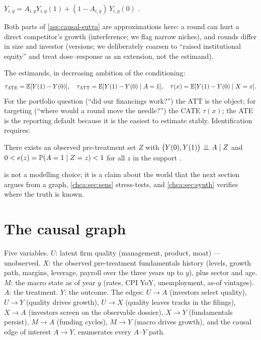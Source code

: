 \begin{assumption}[Consistency]\label{ass:causal-consistency}
$Y_{i,y} = A_{i,y} Y_{i,y}(1) + (1 - A_{i,y})\, Y_{i,y}(0)$ \citep{hernan2020}.
\end{assumption}

Both parts of \cref{ass:causal-sutva} are approximations here: a round can hurt a direct
competitor's growth (interference; we flag narrow niches), and rounds differ in size and
investor (versions; we deliberately coarsen to ``raised institutional equity'' and treat
dose--response as an extension, not the estimand).

The estimands, in decreasing ambition of the conditioning:
\begin{equation}\label{eq:causal-estimands}
\tau_{\mathrm{ATE}} = \mathbb{E}[Y(1) - Y(0)], \quad
\tau_{\mathrm{ATT}} = \mathbb{E}[Y(1) - Y(0) \mid A = 1], \quad
\tau(x) = \mathbb{E}[Y(1) - Y(0) \mid X = x].
\end{equation}
For the portfolio question (``did our financings work?'') the ATT is the object; for targeting
(``where would a round move the needle?'') the CATE $\tau(x)$; the ATE is the reporting default
because it is the easiest to estimate stably. Identification requires:

\begin{assumption}
\label{ass:causal-ignorability} There exists an observed pre-treatment set $Z$ with $\bigl(Y(0),
Y(1)\bigr) \perp\!\!\!\perp A \mid Z$ and $0 < e(z) = \mathbb{P}(A = 1 \mid Z = z) < 1$ for all $z$ in the
support \citep{imbens2015,hernan2020}.
\end{assumption}

 is not a modelling choice; it is a claim about the world that the
next section argues from a graph, \cref{chca:sec:sens} stress-tests, and \cref{chca:sec:synth}
verifies where the truth is known.

\section{The causal graph}\label{chca:sec:dag}

Five variables. $U$: latent firm quality (management, product, moat) --- unobserved. $X$: the
observed pre-treatment fundamentals history (levels, growth path, margins, leverage, payroll
over the three years up to $y$), plus sector and age. $M$: the macro state as of year $y$
(rates, CPI YoY, unemployment, as-of vintages). $A$: the treatment. $Y$: the outcome. The edges:
$U \to A$ (investors select quality), $U \to Y$ (quality drives growth), $U \to X$ (quality
leaves tracks in the filings), $X \to A$ (investors screen on the observable dossier), $X \to Y$
(fundamentals persist), $M \to A$ (funding cycles), $M \to Y$ (macro drives growth), and the
causal edge of interest $A \to Y$.  enumerates every $A$--$Y$ path.

